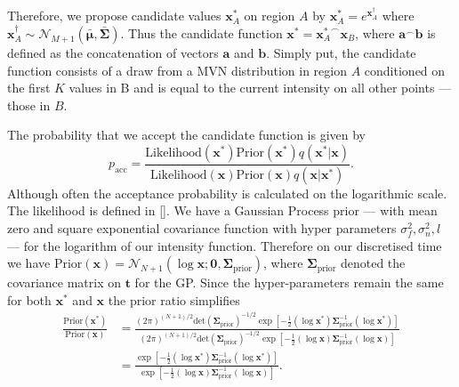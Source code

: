 \documentclass[oneside, 12 pt]{book}
\begin{document}
Therefore, we propose candidate values $\mathbf{x}_{A}^*$ on region $A$ by $\mathbf{x}_{A}^* = e^{\mathbf{x}_{A}^\dag} $ where $\mathbf{x}_{A}^\dag \sim \mathcal{N}_{M+1} \left(\boldsymbol{\bar \mu}, \boldsymbol{\bar \Sigma} \right)$. Thus the candidate function $\mathbf{x}^* = {\mathbf{x}^*_{A}}  ^\frown {\mathbf{x}_{B}}$, where $\mathbf{a} ^\frown \mathbf{b}$ is defined as the concatenation of vectors $\mathbf{a}$ and $\mathbf{b}$. Simply put, the candidate function consists of a draw from a  MVN distribution in region $A$ conditioned on the first $K$ values in B and is equal to the current intensity on all other points --- those in $B$.

The probability that we accept the candidate function is given by 
\begin{equation*}
	p_{\mathrm{acc}}  = \frac{\mathrm{Likelihood}(\mathbf{x}^*) \mathrm{Prior}(\mathbf{x}^*) q(\mathbf{x}^* | \mathbf{x})}{\mathrm{Likelihood}(\mathbf{x}) \mathrm{Prior}(\mathbf{x}) q(\mathbf{x} | \mathbf{x}^*)}.
\end{equation*}
Although often the acceptance probability is calculated on the logarithmic scale. The likelihood is defined in \ref{}. We have a Gaussian Process prior --- with mean zero and square exponential covariance function with hyper parameters $\sigma_f^2, \sigma_n^2, l$ --- for the logarithm of our intensity function. Therefore on our discretised time we have $\mathrm{Prior}(\mathbf{x}) = \mathcal{N}_{N+1}(\log \mathbf{x} ; \boldsymbol{0},\boldsymbol{\Sigma}_\mathrm{prior})$, where $\boldsymbol{\Sigma}_\mathrm{prior}$ denoted the covariance matrix on $\mathbf{t}$ for the GP. Since the hyper-parameters remain the same for both $\mathbf{x}^*$ and $\mathbf{x}$ the prior ratio simplifies 
\begin{align*}
\frac{\mathrm{Prior}(\mathbf{x}^*)}{\mathrm{Prior}(\mathbf{x})} &=	\frac{(2\pi)^{(N+1)/2} \mathrm{det}\left(\boldsymbol{\Sigma}_\mathrm{prior} \right)^{-1/2} \exp \left[ -\frac{1}{2} (\log \mathbf{x}^*) \boldsymbol{\Sigma}_\mathrm{prior} ^{-1} (\log \mathbf{x}^*) \right]}{(2\pi)^{(N+1)/2} \mathrm{det}\left(\boldsymbol{\Sigma}_\mathrm{prior} \right)^{-1/2} \exp \left[ -\frac{1}{2} (\log \mathbf{x}) \boldsymbol{\Sigma}_\mathrm{prior} ^{-1} (\log \mathbf{x}) \right]} \\
&=	\frac{\exp \left[ -\frac{1}{2} (\log \mathbf{x}^*) \boldsymbol{\Sigma}_\mathrm{prior} ^{-1} (\log \mathbf{x}^*) \right]}{ \exp \left[ -\frac{1}{2} (\log \mathbf{x}) \boldsymbol{\Sigma}_\mathrm{prior} ^{-1} (\log \mathbf{x}) \right]}.
\end{align*}
\end{document}
